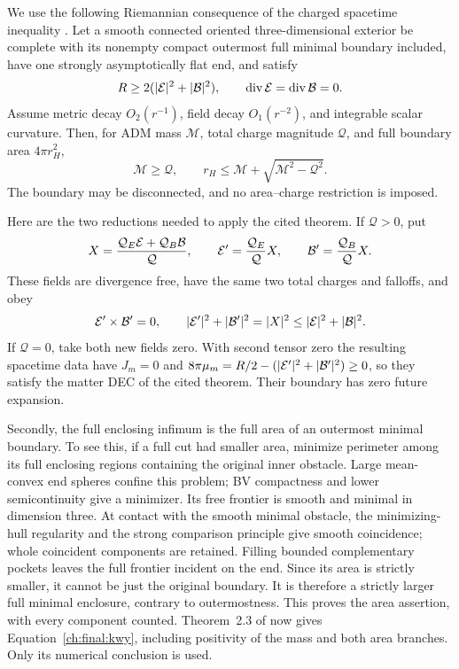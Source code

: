 We use the following Riemannian consequence of the charged spacetime
inequality \cite[Theorem~2.3]{ChargedOriginalData2026}.  Let a smooth
connected oriented three-dimensional exterior be complete with its
nonempty compact outermost full minimal boundary included, have one
strongly asymptotically flat end, and satisfy
\[
 R\ge2(|\mathcal E|^2+|\mathcal B|^2),\qquad
 \operatorname{div}\mathcal E=\operatorname{div}\mathcal B=0.
\]
Assume metric decay $O_2(r^{-1})$, field decay $O_1(r^{-2})$, and
integrable scalar curvature.  Then, for ADM mass $\mathcal M$, total
charge magnitude $\mathcal Q$, and full boundary area $4\pi r_H^2$,
\begin{equation}\label{ch:final:kwy}
 \mathcal M\ge\mathcal Q,\qquad
 r_H\le\mathcal M+\sqrt{\mathcal M^2-\mathcal Q^2}.
\end{equation}
The boundary may be disconnected, and no area--charge restriction is
imposed.

Here are the two reductions needed to apply the cited theorem.
If $\mathcal Q>0$, put
\[
 X=\frac{\mathcal Q_E\mathcal E+\mathcal Q_B\mathcal B}{\mathcal Q},
 \qquad
 \mathcal E'=\frac{\mathcal Q_E}{\mathcal Q}X,
 \qquad
 \mathcal B'=\frac{\mathcal Q_B}{\mathcal Q}X.
\]
These fields are divergence free, have the same two total charges and
falloffs, and obey
\[
 \mathcal E'\times\mathcal B'=0,\qquad
 |\mathcal E'|^2+|\mathcal B'|^2=|X|^2\le|\mathcal E|^2+|\mathcal B|^2.
\]
If $\mathcal Q=0$, take both new fields zero.  With second tensor
zero the resulting spacetime data have $J_m=0$ and
$8\pi\mu_m=R/2-(|\mathcal E'|^2+|\mathcal B'|^2)\ge0$, so they satisfy the
matter DEC of the cited theorem.  Their boundary has zero future
expansion.

Secondly, the full enclosing infimum is the full area of an outermost
minimal boundary.  To see this, if a full cut had smaller area, minimize
perimeter among its full enclosing regions containing the original
inner obstacle.  Large mean-convex end spheres confine this problem;
BV compactness and lower semicontinuity give a minimizer.  Its free
frontier is smooth and minimal in dimension three.  At contact with the
smooth minimal obstacle, the minimizing-hull regularity and the strong
comparison principle give smooth coincidence; whole coincident
components are retained.  Filling bounded complementary pockets leaves
the full frontier incident on the end.  Since its area is strictly
smaller, it cannot be just the original boundary.  It is therefore a
strictly larger full minimal enclosure, contrary to outermostness.
This proves the area assertion, with every component counted.
Theorem~2.3 of \cite{ChargedOriginalData2026} now gives
Equation~\eqref{ch:final:kwy}, including positivity of the mass and both
area branches.  Only its numerical conclusion is used.

